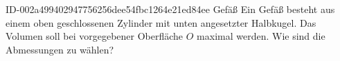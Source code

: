 \begin{exercise}
      {ID-002a499402947756256dee54fbc1264e21ed84ee}
      {Gefäß}
  \ifproblem\problem
    Ein Gefäß besteht aus einem oben geschlossenen Zylinder mit
    unten angesetzter Halbkugel. Das Volumen soll bei vorgegebener
    Oberfläche $O$ maximal werden. Wie sind die Abmessungen zu wählen?
  \fi
\end{exercise}
